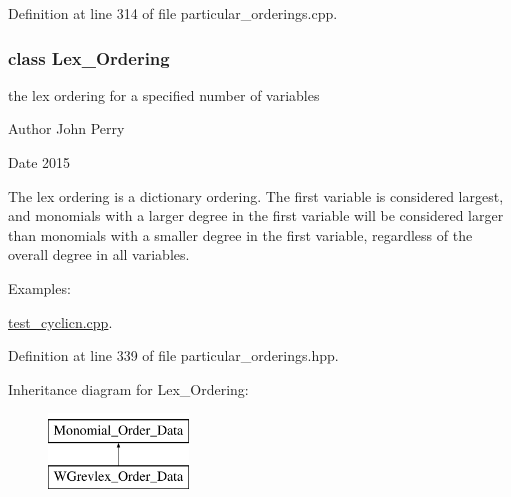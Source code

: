Definition at line 314 of file particular\+\_\+orderings.\+cpp.

\label{class_lex___ordering}
\subsubsection{class Lex\+\_\+\+Ordering}
the lex ordering for a specified number of variables 

\begin{DoxyAuthor}{Author}
John Perry 
\end{DoxyAuthor}
\begin{DoxyDate}{Date}
2015
\end{DoxyDate}
The lex ordering is a dictionary ordering. The first variable is considered largest, and monomials with a larger degree in the first variable will be considered larger than monomials with a smaller degree in the first variable, regardless of the overall degree in all variables. \begin{Desc}
\item[Examples\+: ]\par
\hyperlink{test_cyclicn_8cpp-example}{test\+\_\+cyclicn.\+cpp}.\end{Desc}


Definition at line 339 of file particular\+\_\+orderings.\+hpp.

Inheritance diagram for Lex\+\_\+\+Ordering\+:\begin{figure}[H]
\begin{center}
\leavevmode
\includegraphics[height=2.000000cm]{group__orderinggroup}
\end{center}
\end{figure}
